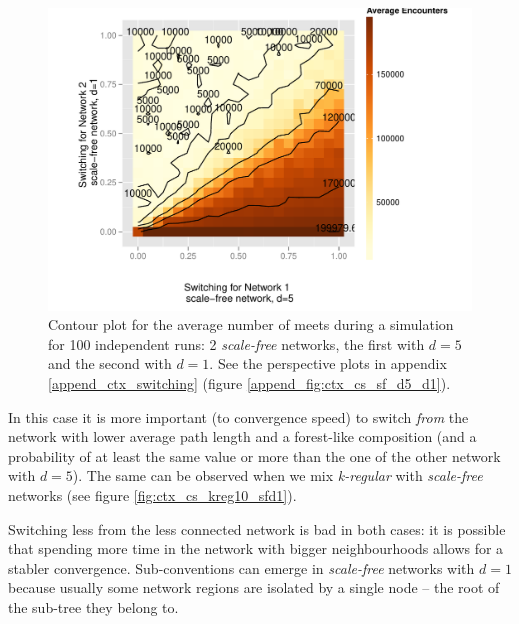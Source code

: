 \documentclass[preprint,number]{elsarticle}
\begin{document}
      \begin{figure}[H]
	\centering
	\includegraphics[width=1\linewidth]{"../analysis/pdf/context_switching_sf_d5_d1_switching_contour"}
	\begin{minipage}{0.9\textwidth}
          \caption{Contour plot for the average number of meets during a simulation for 100
            independent runs: 2 \textit{scale-free} networks, the first with $d=5$ and the second
            with $d=1$. See the perspective plots in appendix \ref{append_ctx_switching} (figure
            \ref{append_fig:ctx_cs_sf_d5_d1}).  }
		\label{fig:ctx_cs_sf_d5_d1}
              \end{minipage}
      \end{figure}

      In this case it is more important (to convergence speed) to switch \textit{from} the network
      with lower average path length and a forest-like composition (and a probability of at least
      the same value or more than the one of the other network with $d=5$). The same can be observed
      when we mix \textit{k-regular} with \textit{scale-free} networks (see figure
      \ref{fig:ctx_cs_kreg10_sfd1}).

      Switching less from the less connected network is bad in both cases: it is possible that
      spending more time in the network with bigger neighbourhoods allows for a stabler
      convergence. Sub-conventions can emerge in \textit{scale-free} networks with $d=1$ because
      usually some network regions are isolated by a single node -- the root of the sub-tree they
      belong to.
\end{document}
